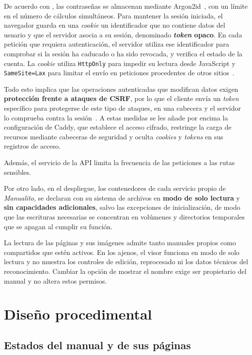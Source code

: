 De acuerdo con , las contraseñas se almacenan mediante
Argon2id~\cite{rfc9106_argon2}, con un límite en el número de cálculos
simultáneos. Para mantener la sesión iniciada, el navegador guarda en una
\textit{cookie} un identificador que no contiene datos del usuario y que el
servidor asocia a su sesión, denominado \textbf{\textit{token} opaco}. En cada
petición que requiera autenticación, el servidor utiliza ese identificador
para comprobar si la sesión ha caducado o ha sido revocada, y verifica el
estado de la cuenta. La \textit{cookie} utiliza \texttt{HttpOnly} para impedir
su lectura desde JavaScript y \texttt{SameSite=Lax} para limitar el envío en
peticiones procedentes de otros sitios~\cite{owasp_session_management}.

Todo esto implica que las operaciones autenticadas que modifican datos exigen \textbf{protección frente a
ataques de \ac{CSRF}}, por lo que el cliente envía un \textit{token} específico para protegerse de este tipo de ataques, en una
cabecera y el servidor lo comprueba contra la sesión~\cite{owasp_csrf}.
A estas medidas se les añade por encima la configuración de Caddy, que establece el acceso
cifrado, restringe la carga de recursos mediante cabeceras de seguridad y
oculta \textit{cookies} y \textit{tokens} en sus registros de acceso.

Además, el servicio de la \ac{API} limita la frecuencia de las peticiones a las rutas
sensibles.

Por otro lado, en el despliegue, los contenedores de cada servicio propio de \textit{Manualito},
se declaran con su sistema de archivos en \textbf{modo de solo lectura} y \textbf{sin capacidades
adicionales}, salvo las excepciones de inicialización, de modo que las
escrituras necesarias se concentran en volúmenes y directorios temporales que se apagan al cumplir su función.

La lectura de las páginas y sus imágenes admite tanto manuales propios como
compartidos que estén activos. En los ajenos, el visor funciona en modo de
solo lectura y no muestra los controles de edición, reprocesado ni los
datos técnicos del reconocimiento. Cambiar la opción de mostrar el nombre
exige ser propietario del manual y no altera estos permisos.

\FloatBarrier
\section{Diseño procedimental}

\FloatBarrier
\subsection{Estados del manual y de sus páginas}

